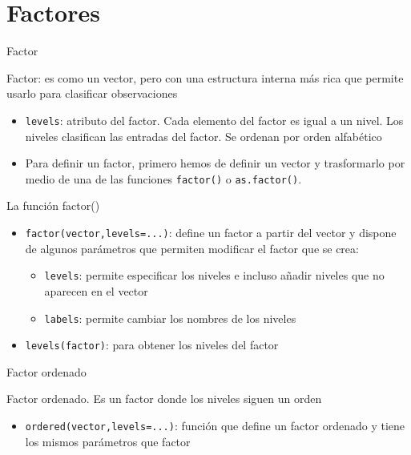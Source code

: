 \documentclass[
  ignorenonframetext,
]{beamer}
\providecommand{\tightlist}{%
  \setlength{\itemsep}{0pt}\setlength{\parskip}{0pt}}
\begin{document}
\hypertarget{factores}{%
\section{Factores}\label{factores}}

\begin{frame}[fragile]{Factor}
\protect\hypertarget{factor}{}

Factor: es como un vector, pero con una estructura interna más rica que
permite usarlo para clasificar observaciones

\begin{itemize}
\tightlist
\item
  \texttt{levels}: atributo del factor. Cada elemento del factor es
  igual a un nivel. Los niveles clasifican las entradas del factor. Se
  ordenan por orden alfabético
\item
  Para definir un factor, primero hemos de definir un vector y
  trasformarlo por medio de una de las funciones \texttt{factor()} o
  \texttt{as.factor()}.
\end{itemize}

\end{frame}

\begin{frame}[fragile]{La función factor()}
\protect\hypertarget{la-funciuxf3n-factor}{}

\begin{itemize}
\item
  \texttt{factor(vector,levels=...)}: define un factor a partir del
  vector y dispone de algunos parámetros que permiten modificar el
  factor que se crea:

  \begin{itemize}
  \tightlist
  \item
    \texttt{levels}: permite especificar los niveles e incluso añadir
    niveles que no aparecen en el vector
  \item
    \texttt{labels}: permite cambiar los nombres de los niveles
  \end{itemize}
\item
  \texttt{levels(factor)}: para obtener los niveles del factor
\end{itemize}

\end{frame}

\begin{frame}[fragile]{Factor ordenado}
\protect\hypertarget{factor-ordenado}{}

Factor ordenado. Es un factor donde los niveles siguen un orden

\begin{itemize}
\tightlist
\item
  \texttt{ordered(vector,levels=...)}: función que define un factor
  ordenado y tiene los mismos parámetros que factor
\end{itemize}

\end{frame}
\end{document}
